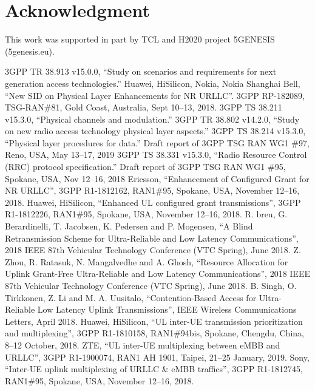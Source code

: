 \documentclass{ieeeaccess}
\begin{document}
\section*{Acknowledgment}

This work was supported in part by TCL and H2020 project 5GENESIS (5genesis.eu).

\begin{thebibliography}{00}

 3GPP TR 38.913 v15.0.0, ``Study on scenarios and requirements for next generation access technologies.''
 Huawei, HiSilicon, Nokia, Nokia Shanghai Bell, ``New SID on Physical Layer Enhancements for NR URLLC''. 3GPP RP-182089, TSG-RAN\#81, Gold Coast, Australia, Sept 10--13, 2018.
 3GPP TS 38.211 v15.3.0, ``Physical channels and modulation.''
 3GPP TR 38.802 v14.2.0, ``Study on new radio access technology physical layer aspects.''
 3GPP TS 38.214 v15.3.0, ``Physical layer procedures for data.''
 Draft report of 3GPP TSG RAN WG1 \#97, Reno, USA, May 13--17, 2019
 3GPP TS 38.331 v15.3.0, ``Radio Resource Control (RRC) protocol specification.''
 Draft report of 3GPP TSG RAN WG1 \#95, Spokane, USA, Nov 12--16, 2018
 Ericsson, ``Enhancement of Configured Grant for NR URLLC'', 3GPP R1-1812162, RAN1\#95, Spokane, USA, November 12--16, 2018.
 Huawei, HiSilicon, ``Enhanced UL configured grant transmissions'', 3GPP R1-1812226, RAN1\#95, Spokane, USA, November 12--16, 2018.
 R. breu, G. Berardinelli, T. Jacobsen, K. Pedersen and P. Mogensen, ``A Blind Retransmission Scheme for Ultra-Reliable and Low Latency Communications'', 2018 IEEE 87th Vehicular Technology Conference (VTC Spring), June 2018.
 Z. Zhou, R. Ratasuk, N. Mangalvedhe and A. Ghosh, ``Resource Allocation for Uplink Grant-Free Ultra-Reliable and Low Latency Communications'', 2018 IEEE 87th Vehicular Technology Conference (VTC Spring), June 2018.
 B. Singh, O. Tirkkonen, Z. Li and M. A. Uusitalo, ``Contention-Based Access for Ultra-Reliable Low Latency Uplink Transmissions'',  IEEE Wireless Communications Letters, April 2018.
 Huawei, HiSilicon, ``UL inter-UE transmission prioritization and multiplexing'', 3GPP R1-1810158, RAN1\#94bis, Spokane, Chengdu, China, 8--12 October, 2018.
 ZTE, ``UL inter-UE multiplexing between eMBB and URLLC'', 3GPP R1-1900074, RAN1 AH 1901, Taipei,  21--25 January, 2019.
  Sony, ``Inter-UE uplink multiplexing of URLLC \& eMBB traffics'', 3GPP R1-1812745, RAN1\#95, Spokane, USA, November 12--16, 2018.

\end{thebibliography}
\end{document}
